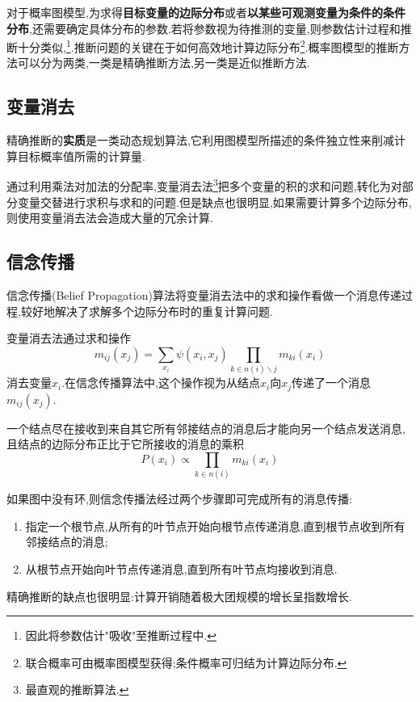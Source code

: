对于概率图模型,为求得\textbf{目标变量的边际分布}或者\textbf{以某些可观测变量为条件的条件分布},还需要确定具体分布的参数.若将参数视为待推测的变量,则参数估计过程和推断十分类似,\footnote{因此将参数估计"吸收"至推断过程中.}.推断问题的关键在于如何高效地计算边际分布\footnote{联合概率可由概率图模型获得;条件概率可归结为计算边际分布.}.概率图模型的推断方法可以分为两类,一类是精确推断方法,另一类是近似推断方法.

\subsection{变量消去}

精确推断的\textbf{实质}是一类动态规划算法,它利用图模型所描述的条件独立性来削减计算目标概率值所需的计算量.

通过利用乘法对加法的分配率,变量消去法\footnote{最直观的推断算法.}把多个变量的积的求和问题,转化为对部分变量交替进行求积与求和的问题.但是缺点也很明显,如果需要计算多个边际分布,则使用变量消去法会造成大量的冗余计算.

\subsection{信念传播}

信念传播(Belief Propagation)算法将变量消去法中的求和操作看做一个消息传递过程,较好地解决了求解多个边际分布时的重复计算问题.

变量消去法通过求和操作
\begin{equation}
m_{ij}(x_j)=\sum_{x_i}\psi(x_i,x_j)\prod_{k\in n(i)\backslash j}m_{ki}(x_i)
\end{equation}
消去变量$x_i$.在信念传播算法中,这个操作视为从结点$x_i$向$x_j$传递了一个消息$m_{ij}(x_j)$.

一个结点尽在接收到来自其它所有邻接结点的消息后才能向另一个结点发送消息,且结点的边际分布正比于它所接收的消息的乘积
\begin{equation}
P(x_i)\propto\prod_{k\in n(i)}m_{ki}(x_i)
\end{equation}

如果图中没有环,则信念传播法经过两个步骤即可完成所有的消息传播:
\begin{enumerate}
\item 指定一个根节点,从所有的叶节点开始向根节点传递消息,直到根节点收到所有邻接结点的消息;
\item 从根节点开始向叶节点传递消息,直到所有叶节点均接收到消息.
\end{enumerate}

精确推断的缺点也很明显:计算开销随着极大团规模的增长呈指数增长.

